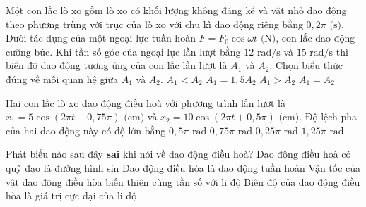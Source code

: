 \begin{ex}%
	Một con lắc lò xo gồm lò xo có khối lượng không đáng kể và vật nhỏ dao động theo phương trùng với trục của lò xo với chu kì dao động riêng bằng $0,2\pi\text{ (s)}$. Dưới tác dụng của một ngoại lực tuần hoàn $F = F_0\cos\omega t\text{ (N)}$, con lắc dao động cưỡng bức. Khi tần số góc của ngoại lực lần lượt bằng $12\text{ rad/s}$ và $15\text{ rad/s}$ thì biên độ dao động tương ứng của con lắc lần lượt là $A_1$ và $A_2$. Chọn biểu thức đúng về mối quan hệ giữa $A_1$ và $A_2$.
	\choice
	{$A_1 < A_2$}
	{$A_1 = 1,5A_2$}
	{\True $A_1 > A_2$}
	{$A_1 = A_2$}
\end{ex}

\begin{ex}%
	Hai con lắc lò xo dao động điều hoà với phương trình lần lượt là $x_1 = 5\cos(2\pi t + 0,75\pi)\text{ (cm)}$ và $x_2 = 10\cos(2\pi t + 0,5\pi)\text{ (cm)}$. Độ lệch pha của hai dao động này có độ lớn bằng
	\choice
	{$0,5\pi\text{ rad}$}
	{$0,75\pi\text{ rad}$}
	{\True $0,25\pi\text{ rad}$}
	{$1,25\pi\text{ rad}$}
\end{ex}

\begin{ex}%
	Phát biểu nào sau đây \textbf{sai} khi nói về dao động điều hoà?
	\choice
	{\True Dao động điều hoà có quỹ đạo là đường hình sin}
	{Dao động điều hòa là dao động tuần hoàn}
	{Vận tốc của vật dao động điều hòa biến thiên cùng tần số với li độ}
	{Biên độ của dao động điều hòa là giá trị cực đại của li độ}
\end{ex}

